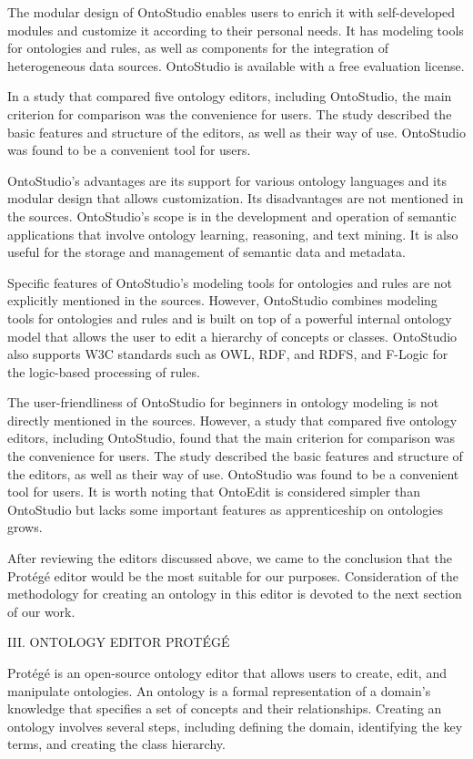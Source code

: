 \documentclass[a4paper,10pt,twocolumn]{article}
\begin{document}
The modular design of OntoStudio enables users to
enrich it with self-developed modules and customize it
according to their personal needs. It has modeling tools
for ontologies and rules, as well as components for the
integration of heterogeneous data sources. OntoStudio is
available with a free evaluation license.

In a study that compared five ontology editors, including
OntoStudio, the main criterion for comparison was
the convenience for users. The study described the basic
features and structure of the editors, as well as their way
of use. OntoStudio was found to be a convenient tool for
users.

OntoStudio’s advantages are its support for various
ontology languages and its modular design that allows
customization. Its disadvantages are not mentioned in the
sources. OntoStudio’s scope is in the development and
operation of semantic applications that involve ontology
learning, reasoning, and text mining. It is also useful
for the storage and management of semantic data and
metadata.

Specific features of OntoStudio’s modeling tools for
ontologies and rules are not explicitly mentioned in
the sources. However, OntoStudio combines modeling
tools for ontologies and rules and is built on top of a
powerful internal ontology model that allows the user to
edit a hierarchy of concepts or classes. OntoStudio also
supports W3C standards such as OWL, RDF, and RDFS,
and F-Logic for the logic-based processing of rules.

The user-friendliness of OntoStudio for beginners in
ontology modeling is not directly mentioned in the
sources. However, a study that compared five ontology
editors, including OntoStudio, found that the main criterion
for comparison was the convenience for users. The
study described the basic features and structure of the
editors, as well as their way of use. OntoStudio was
found to be a convenient tool for users. It is worth noting
that OntoEdit is considered simpler than OntoStudio
but lacks some important features as apprenticeship on
ontologies grows.

After reviewing the editors discussed above, we came
to the conclusion that the Protégé editor would be the
most suitable for our purposes. Consideration of the
methodology for creating an ontology in this editor is
devoted to the next section of our work.
\begin{center}
	\large{III. O}\small{NTOLOGY} \large{E}\small{DITOR} \large{P}\small{ROTÉGÉ}
\end{center}
Protégé is an open-source ontology editor that allows
users to create, edit, and manipulate ontologies. An ontology
is a formal representation of a domain’s knowledge
that specifies a set of concepts and their relationships.
Creating an ontology involves several steps, including
defining the domain, identifying the key terms, and
creating the class hierarchy.
\end{document}
